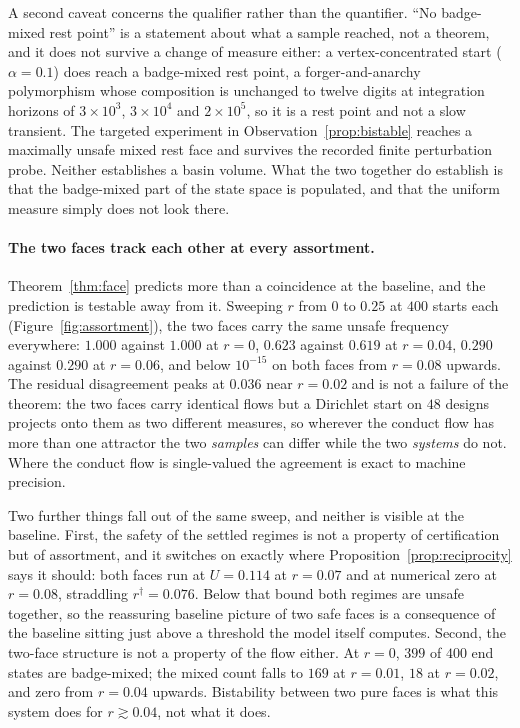 \documentclass[11pt,a4paper]{article}
\theoremstyle{definition}
\begin{document}
A second caveat concerns the qualifier rather than the quantifier. ``No
badge-mixed rest point'' is a statement about what a sample reached, not a
theorem, and it does not survive a change of measure either: a
vertex-concentrated start ($\alpha = 0.1$) does reach a badge-mixed rest point,
a forger-and-anarchy polymorphism whose composition is unchanged to twelve
digits at integration horizons of $3\times10^{3}$, $3\times10^{4}$ and
$2\times10^{5}$, so it is a rest point and not a slow transient. The targeted
experiment in Observation~\ref{prop:bistable} reaches a maximally unsafe mixed
rest face and survives the recorded finite perturbation probe. Neither
establishes a basin volume. What the two together do establish is that the
badge-mixed part of the state space is populated, and that the uniform measure
simply does not look there.

\paragraph{The two faces track each other at every assortment.}
Theorem~\ref{thm:face} predicts more than a coincidence at the baseline, and
the prediction is testable away from it. Sweeping $r$ from $0$ to $0.25$ at
$400$ starts each (Figure~\ref{fig:assortment}), the two faces carry the same
unsafe frequency everywhere: $1.000$ against $1.000$ at $r = 0$, $0.623$
against $0.619$ at $r = 0.04$, $0.290$ against $0.290$ at $r = 0.06$, and below
$10^{-15}$ on both faces from $r = 0.08$ upwards. The residual disagreement
peaks at $0.036$ near $r = 0.02$ and is not a failure of the theorem: the two
faces carry identical flows but a $\mathrm{Dirichlet}$ start on $48$ designs
projects onto them as two different measures, so wherever the conduct flow has
more than one attractor the two \emph{samples} can differ while the two
\emph{systems} do not. Where the conduct flow is single-valued the agreement is
exact to machine precision.

Two further things fall out of the same sweep, and neither is visible at the
baseline. First, the safety of the settled regimes is not a property of
certification but of assortment, and it switches on exactly where
Proposition~\ref{prop:reciprocity} says it should: both faces run at
$U = 0.114$ at $r = 0.07$ and at numerical zero at $r = 0.08$, straddling
$r^{\dagger} = 0.076$. Below that bound both regimes are unsafe together, so
the reassuring baseline picture of two safe faces is a consequence of the
baseline sitting just above a threshold the model itself computes. Second, the
two-face structure is not a property of the flow either. At $r = 0$, $399$ of
$400$ end states are badge-mixed; the mixed count falls to $169$ at
$r = 0.01$, $18$ at $r = 0.02$, and zero from $r = 0.04$ upwards. Bistability
between two pure faces is what this system does for $r \gtrsim 0.04$, not what
it does.
\end{document}
